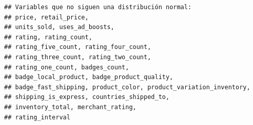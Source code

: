 \documentclass[
]{article}
\newenvironment{Shaded}{\begin{snugshade}}{\end{snugshade}}
\newcommand{\CharTok}[1]{\textcolor[rgb]{0.31,0.60,0.02}{#1}}
\newcommand{\ControlFlowTok}[1]{\textcolor[rgb]{0.13,0.29,0.53}{\textbf{#1}}}
\newcommand{\DecValTok}[1]{\textcolor[rgb]{0.00,0.00,0.81}{#1}}
\newcommand{\FloatTok}[1]{\textcolor[rgb]{0.00,0.00,0.81}{#1}}
\newcommand{\KeywordTok}[1]{\textcolor[rgb]{0.13,0.29,0.53}{\textbf{#1}}}
\newcommand{\NormalTok}[1]{#1}
\newcommand{\OperatorTok}[1]{\textcolor[rgb]{0.81,0.36,0.00}{\textbf{#1}}}
\newcommand{\StringTok}[1]{\textcolor[rgb]{0.31,0.60,0.02}{#1}}
\begin{document}
\begin{Shaded}
\end{Shaded}

\begin{verbatim}
## Variables que no siguen una distribución normal:
## price, retail_price, 
## units_sold, uses_ad_boosts, 
## rating, rating_count, 
## rating_five_count, rating_four_count, 
## rating_three_count, rating_two_count, 
## rating_one_count, badges_count, 
## badge_local_product, badge_product_quality, 
## badge_fast_shipping, product_color, product_variation_inventory, 
## shipping_is_express, countries_shipped_to, 
## inventory_total, merchant_rating, 
## rating_interval
\end{verbatim}
\end{document}
